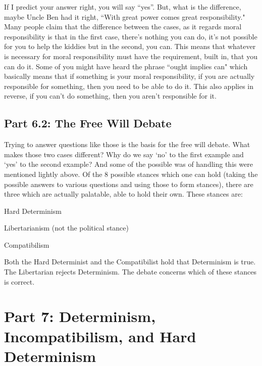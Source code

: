 
If I predict your answer right, you will say “yes”.  But, what is the difference, maybe Uncle Ben had it right, ``With great power comes great responsibility." Many people claim that the difference between the cases, as it regards moral responsibility is that in the first case, there’s nothing you can do, it’s not possible for you to help the kiddies but in the second, you can.  This means that whatever is necessary for moral responsibility must have the requirement, built in, that you can do it. Some of you might have heard the phrase ``ought implies can" which basically means that if something is your moral responsibility, if you are actually responsible for something, then you need to be able to do it. This also applies in reverse, if you can't do something, then you aren't responsible for it. 

\section{Part 6.2: The Free Will Debate}

Trying to answer questions like those is the basis for the free will debate. What makes those two cases different? Why do we say ‘no’ to the first example and ‘yes’ to the second example? And some of the possible was of handling this were mentioned lightly above. Of the 8 possible stances which one can hold (taking the possible answers to various questions and using those to form stances), there are three which are actually palatable, able to hold their own. These stances are:
\begin{earg}
   \item[]  Hard Determinism
    \item[] Libertarianism (not the political stance)
    \item[] Compatibilism 
\end{earg}
Both the Hard Determinist and the Compatibilist hold that Determinism is true. The Libertarian rejects Determinism. The debate concerns which of these stances is correct. 
\chapter{Part 7: Determinism, Incompatibilism, and Hard Determinism}
